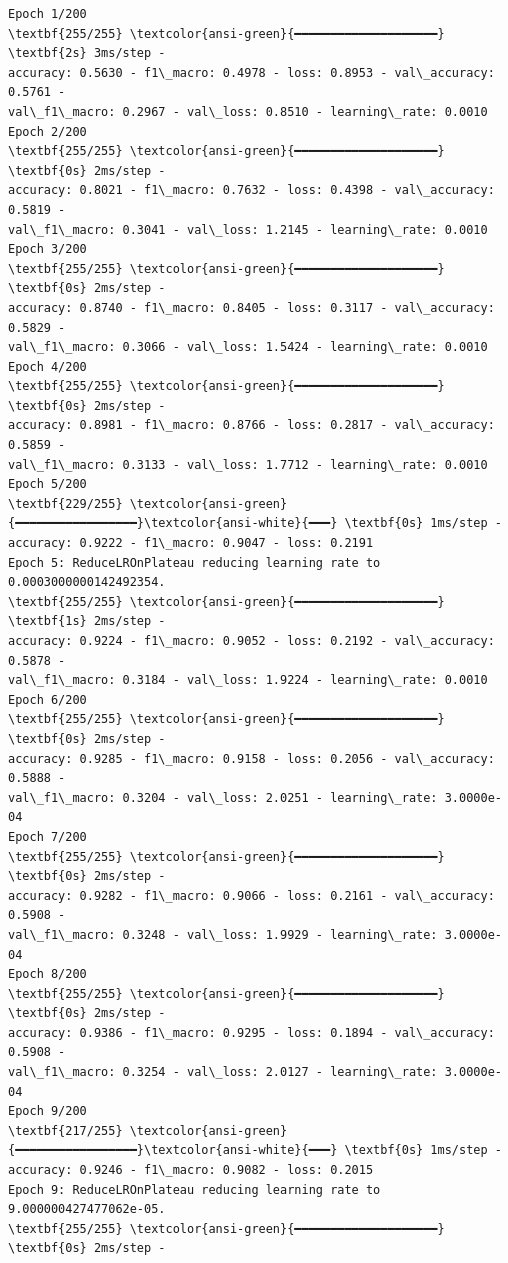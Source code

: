 \documentclass[11pt]{article}
\begin{document}
    \begin{Verbatim}[commandchars=\\\{\}]
Epoch 1/200
\textbf{255/255} \textcolor{ansi-green}{━━━━━━━━━━━━━━━━━━━━} \textbf{2s} 3ms/step -
accuracy: 0.5630 - f1\_macro: 0.4978 - loss: 0.8953 - val\_accuracy: 0.5761 -
val\_f1\_macro: 0.2967 - val\_loss: 0.8510 - learning\_rate: 0.0010
Epoch 2/200
\textbf{255/255} \textcolor{ansi-green}{━━━━━━━━━━━━━━━━━━━━} \textbf{0s} 2ms/step -
accuracy: 0.8021 - f1\_macro: 0.7632 - loss: 0.4398 - val\_accuracy: 0.5819 -
val\_f1\_macro: 0.3041 - val\_loss: 1.2145 - learning\_rate: 0.0010
Epoch 3/200
\textbf{255/255} \textcolor{ansi-green}{━━━━━━━━━━━━━━━━━━━━} \textbf{0s} 2ms/step -
accuracy: 0.8740 - f1\_macro: 0.8405 - loss: 0.3117 - val\_accuracy: 0.5829 -
val\_f1\_macro: 0.3066 - val\_loss: 1.5424 - learning\_rate: 0.0010
Epoch 4/200
\textbf{255/255} \textcolor{ansi-green}{━━━━━━━━━━━━━━━━━━━━} \textbf{0s} 2ms/step -
accuracy: 0.8981 - f1\_macro: 0.8766 - loss: 0.2817 - val\_accuracy: 0.5859 -
val\_f1\_macro: 0.3133 - val\_loss: 1.7712 - learning\_rate: 0.0010
Epoch 5/200
\textbf{229/255} \textcolor{ansi-green}{━━━━━━━━━━━━━━━━━}\textcolor{ansi-white}{━━━} \textbf{0s} 1ms/step -
accuracy: 0.9222 - f1\_macro: 0.9047 - loss: 0.2191
Epoch 5: ReduceLROnPlateau reducing learning rate to 0.0003000000142492354.
\textbf{255/255} \textcolor{ansi-green}{━━━━━━━━━━━━━━━━━━━━} \textbf{1s} 2ms/step -
accuracy: 0.9224 - f1\_macro: 0.9052 - loss: 0.2192 - val\_accuracy: 0.5878 -
val\_f1\_macro: 0.3184 - val\_loss: 1.9224 - learning\_rate: 0.0010
Epoch 6/200
\textbf{255/255} \textcolor{ansi-green}{━━━━━━━━━━━━━━━━━━━━} \textbf{0s} 2ms/step -
accuracy: 0.9285 - f1\_macro: 0.9158 - loss: 0.2056 - val\_accuracy: 0.5888 -
val\_f1\_macro: 0.3204 - val\_loss: 2.0251 - learning\_rate: 3.0000e-04
Epoch 7/200
\textbf{255/255} \textcolor{ansi-green}{━━━━━━━━━━━━━━━━━━━━} \textbf{0s} 2ms/step -
accuracy: 0.9282 - f1\_macro: 0.9066 - loss: 0.2161 - val\_accuracy: 0.5908 -
val\_f1\_macro: 0.3248 - val\_loss: 1.9929 - learning\_rate: 3.0000e-04
Epoch 8/200
\textbf{255/255} \textcolor{ansi-green}{━━━━━━━━━━━━━━━━━━━━} \textbf{0s} 2ms/step -
accuracy: 0.9386 - f1\_macro: 0.9295 - loss: 0.1894 - val\_accuracy: 0.5908 -
val\_f1\_macro: 0.3254 - val\_loss: 2.0127 - learning\_rate: 3.0000e-04
Epoch 9/200
\textbf{217/255} \textcolor{ansi-green}{━━━━━━━━━━━━━━━━━}\textcolor{ansi-white}{━━━} \textbf{0s} 1ms/step -
accuracy: 0.9246 - f1\_macro: 0.9082 - loss: 0.2015
Epoch 9: ReduceLROnPlateau reducing learning rate to 9.000000427477062e-05.
\textbf{255/255} \textcolor{ansi-green}{━━━━━━━━━━━━━━━━━━━━} \textbf{0s} 2ms/step -

\end{Verbatim}
\end{document}

